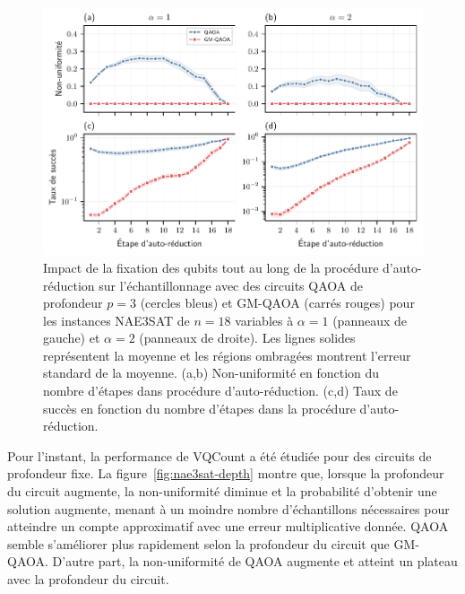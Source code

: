 \begin{figure}[ht!]
    \centering
    \includegraphics[width=1\textwidth]{figures/nae3sat-self-reduction-step.pdf}
    \caption[Impact de la procédure d'auto-réduction sur la non-uniformité pour \#NAE3SAT]{Impact de la fixation des qubits tout au long de la procédure d'auto-réduction sur l'échantillonnage avec des circuits QAOA de profondeur $p=3$ (cercles bleus) et GM-QAOA (carrés rouges) pour les instances NAE3SAT de $n=18$ variables à $\alpha=1$ (panneaux de gauche) et $\alpha=2$ (panneaux de droite). Les lignes solides représentent la moyenne et les régions ombragées montrent l'erreur standard de la moyenne. (a,b) Non-uniformité en fonction du nombre d'étapes dans procédure d'auto-réduction. (c,d) Taux de succès en fonction du nombre d'étapes dans la procédure d'auto-réduction.}
    \label{fig:nae3sat-jvv-steps}
\end{figure}

Pour l'instant, la performance de VQCount a été étudiée pour des circuits de profondeur fixe. La figure~\ref{fig:nae3sat-depth} montre que, lorsque la profondeur du circuit augmente, la non-uniformité diminue et la probabilité d'obtenir une solution augmente, menant à un moindre nombre d'échantillons nécessaires pour atteindre un compte approximatif avec une erreur multiplicative donnée. QAOA semble s'améliorer plus rapidement selon la profondeur du circuit que GM-QAOA. D'autre part, la non-uniformité de QAOA augmente et atteint un plateau avec la profondeur du circuit.

